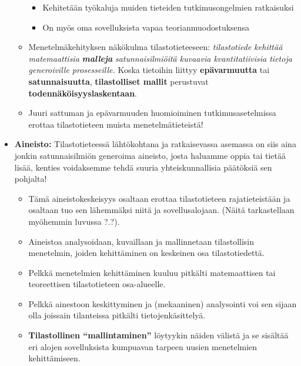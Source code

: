 \documentclass[
]{book}
\providecommand{\tightlist}{%
  \setlength{\itemsep}{0pt}\setlength{\parskip}{0pt}}
\begin{document}
\begin{itemize}
\begin{itemize}
    \begin{itemize}
    \tightlist
    \item
      Kehitetään työkaluja muiden tieteiden tutkimusongelmien ratkaisuksi
    \item
      On myös oma sovelluksista vapaa teorianmuodostuksensa
    \end{itemize}
  \item
    Menetelmäkehityksen näkökulma tilastotieteeseen: \emph{tilastotiede kehittää matemaattisia} \textbf{\emph{malleja}} \emph{satunnaisilmiöitä kuvaavia kvantitatiivisia tietoja generoiville prosesseille.} Koska tietoihin liittyy \textbf{epävarmuutta} tai \textbf{satunnaisuutta}, \textbf{tilastolliset mallit} perustuvat \textbf{todennäköisyyslaskentaan}.
  \item
    Juuri sattuman ja epävarmuuden huomioiminen tutkimusasetelmissa erottaa tilastotieteen muista menetelmätieteistä!
  \end{itemize}
\item
  \textbf{Aineisto:} Tilastotieteessä lähtökohtana ja ratkaisevassa asemassa on siis aina jonkin satunnaisilmiön generoima aineisto, josta haluamme oppia tai tietää lisää, kenties voidaksemme tehdä suuria yhteiskunnallisia päätöksiä sen pohjalta!

  \begin{itemize}
  \tightlist
  \item
    Tämä aineistokeskeisyys osaltaan erottaa tilastotieteen rajatieteistään ja osaltaan tuo sen lähemmäksi niitä ja sovellusalojaan. (Näitä tarkastellaan myöhemmin luvussa ?.?).
  \item
    Aineistoa analysoidaan, kuvaillaan ja mallinnetaan tilastollisin menetelmin, joiden kehittäminen on keskeinen osa tilastotiedettä.
  \item
    Pelkkä menetelmien kehittäminen kuuluu pitkälti matemaattisen tai teoreettisen tilastotieteen osa-alueelle.
  \item
    Pelkkä ainestoon keskittyminen ja (mekaaninen) analysointi voi sen sijaan olla joissain tilanteissa pitkälti tietojenkäsittelyä.
  \item
    \textbf{Tilastollinen ``mallintaminen''} löytyykin näiden välistä ja se sisältää eri alojen sovelluksista kumpuavan tarpeen uusien menetelmien kehittämiseen.


\end{itemize}
\end{itemize}
\end{document}
